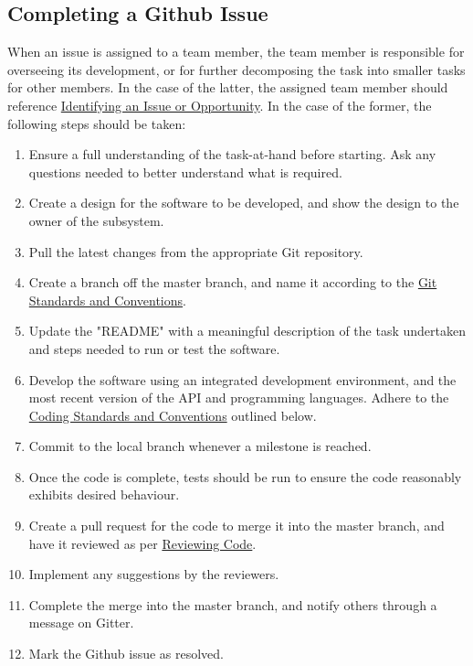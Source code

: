\documentclass{article}
\begin{document}
\subsection{Completing a Github Issue}
\label{sec:github-issue}
When an issue is assigned to a team member, the team member is responsible for overseeing its development, or for further decomposing the task into smaller tasks for other members. In the case of the latter, the assigned team member should reference \hyperref[sec:issues-opportunity]{Identifying an Issue or Opportunity}. In the case of the former, the following steps should be taken:

\begin{enumerate}
\item Ensure a full understanding of the task-at-hand before starting. Ask any questions needed to better understand what is required.
\item Create a design for the software to be developed, and show the design to the owner of the subsystem.
\item Pull the latest changes from the appropriate Git repository.
\item Create a branch off the master branch, and name it according to the \hyperref[sec:git-conventions]{Git Standards and Conventions}.
\item Update the "README" with a meaningful description of the task undertaken and steps needed to run or test the software.
\item Develop the software using an integrated development environment, and the most recent version of the API and programming languages. Adhere to the \hyperref[sec:code-standards]{Coding Standards and Conventions} outlined below.
\item Commit to the local branch whenever a milestone is reached.
\item Once the code is complete, tests should be run to ensure the code reasonably exhibits desired behaviour.
\item Create a pull request for the code to merge it into the master branch, and have it reviewed as per \hyperref[sec:reviewing-code]{Reviewing Code}.
\item Implement any suggestions by the reviewers.
\item Complete the merge into the master branch, and notify others through a message on Gitter.
\item Mark the Github issue as resolved.
\end{enumerate}
\end{document}
